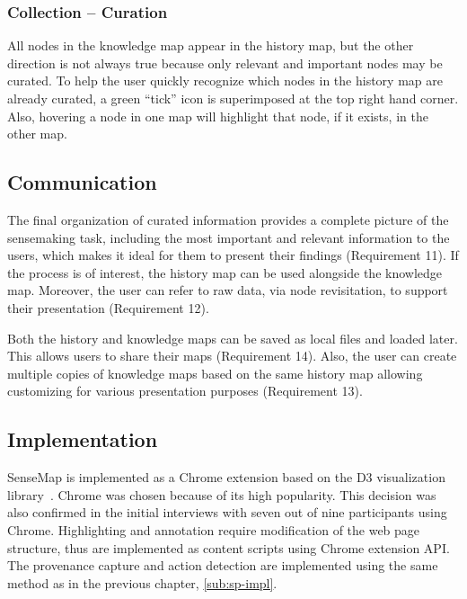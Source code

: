 \subsubsection{Collection -- Curation}
All nodes in the knowledge map appear in the history map, but the other direction is not always true because only relevant and important nodes may be curated. To help the user quickly recognize which nodes in the history map are already curated, a green ``tick'' icon is superimposed at the top right hand corner. Also, hovering a node in one map will highlight that node, if it exists, in the other map.

\subsection{Communication}
The final organization of curated information provides a complete picture of the sensemaking task, including the most important and relevant information to the users, which makes it ideal for them to present their findings (Requirement 11). If the process is of interest, the history map can be used alongside the knowledge map. Moreover, the user can refer to raw data, via node revisitation, to support their presentation (Requirement 12).

Both the history and knowledge maps can be saved as local files and loaded later. This allows users to share their maps (Requirement 14). Also, the user can create multiple copies of knowledge maps based on the same history map allowing customizing for various presentation purposes (Requirement 13).

\subsection{Implementation}
SenseMap is implemented as a Chrome extension based on the D3 visualization library~\cite{Bostock2011}. Chrome was chosen because of its high popularity. This decision was also confirmed in the initial interviews with seven out of nine participants using Chrome. Highlighting and annotation require modification of the web page structure, thus are implemented as content scripts using Chrome extension API. The provenance capture and action detection are implemented using the same method as in the previous chapter, \autoref{sub:sp-impl}.

